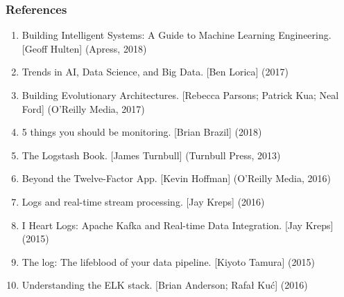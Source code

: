 \documentclass[11pt]{beamer}
\begin{document}
\begin{frame}
\frametitle{References}
\begin{enumerate}
	\item Building Intelligent Systems: A Guide to Machine Learning Engineering. [Geoff Hulten] (Apress, 2018)
	\item Trends in AI, Data Science, and Big Data. [Ben Lorica] (2017)
	\item Building Evolutionary Architectures. [Rebecca Parsons; Patrick Kua; Neal Ford] (O'Reilly Media, 2017)
	\item 5 things you should be monitoring. [Brian Brazil] (2018)
	\item The Logstash Book. [James Turnbull] (Turnbull Press, 2013)
	\item Beyond the Twelve-Factor App. [Kevin Hoffman] (O'Reilly Media, 2016)
	\item Logs and real-time stream processing. [Jay Kreps] (2016)
	\item I Heart Logs: Apache Kafka and Real-time Data Integration. [Jay Kreps] (2015)
	\item The log: The lifeblood of your data pipeline. [Kiyoto Tamura] (2015)
	\item Understanding the ELK stack. [Brian Anderson; Rafał Kuć] (2016)
\end{enumerate}
\end{frame}
\end{document}

